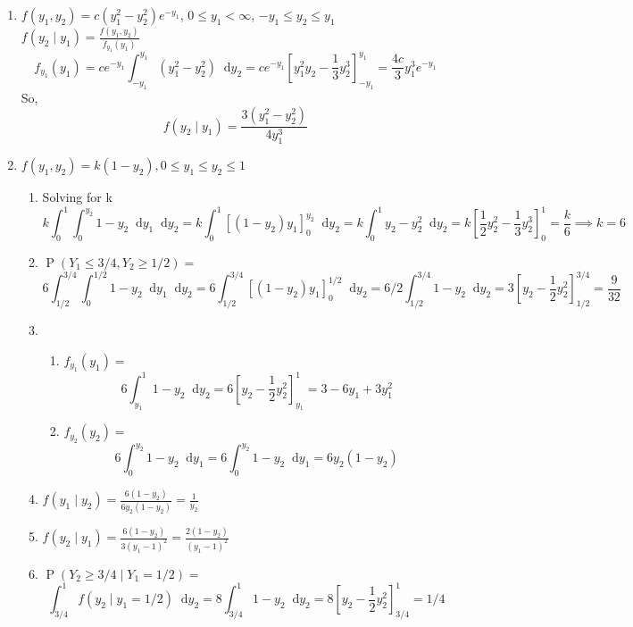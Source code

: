 \documentclass{article}
\newcommand{\pr}[1]{\operatorname{P}\left(#1\right)}
\newcommand*\diff{\mathop{}\!\mathrm{d}}
\newcommand{\intv}[4]{\int_{#3}^{#4} #1 \diff #2}
\begin{document}
\begin{enumerate}
  \item $f(y_1, y_2) = c(y_1^2 - y_2^2)e^{-y_1}$, $0 \leq y_1 < \infty$, $-y_1 \leq y_2 \leq y_1$\\
  $f(y_2 \mid y_1) = \frac{f(y_1, y_2)}{f_{y_1}(y_1)}$ 
  \[
    f_{y_1}(y_1) 
    = ce^{-y_1}\intv{(y_1^2 - y_2^2)}{y_2}{-y_1}{y_1}
    = ce^{-y_1}\left[ y_1^2y_2 - \frac{1}{3}y_2^3 \right]_{-y_1}^{y_1}
    = \frac{4c}{3}y_1^3e^{-y_1}
  \]
  So, \[
    f(y_2 \mid y_1) = \frac{3(y_1^2-y_2^2)}{4y_1^3}
  \]
  \newpage

  \item $f(y_1, y_2) = k(1-y_2), 0 \leq y_1 \leq y_2 \leq 1$
  \begin{enumerate}
    \item Solving for k\[
      k\intv{ \intv{1-y_2}{y_1}{0}{y_2} }{y_2}{0}{1}
      = k\intv{ \left[ (1-y_2)y_1 \right]_{0}^{y_2} }{y_2}{0}{1}
      = k\intv{ y_2 - y_2^2 }{y_2}{0}{1}
      = k\left[ \frac{1}{2}y_2^2 - \frac{1}{3}y_2^3 \right]_{0}^{1}
      = \frac{k}{6} \implies k = 6
    \]

    \item $\pr{Y_1 \leq 3/4, Y_2 \geq 1/2} = $ \[
      6\intv{ \intv{1-y_2}{y_1}{0}{1/2} }{y_2}{1/2}{3/4}
      = 6\intv{ \left[ (1-y_2)y_1 \right]_{0}^{1/2} }{y_2}{1/2}{3/4}
      = 6/2\intv{ 1-y_2 }{y_2}{1/2}{3/4}
      = 3 \left[ y_2 - \frac{1}{2}y_2^2 \right]_{1/2}^{3/4}
      = \frac{9}{32}
    \]

    \item \begin{enumerate}
      \item $f_{y_1}(y_1) = $ \[
        6\intv{ 1-y_2 }{y_2}{y_1}{1}
        = 6\left[ y_2-\frac{1}{2}y_2^2 \right]_{y_1}^{1}
        = 3 - 6y_1 + 3y_1^2
      \]
      \item $f_{y_2}(y_2) = $ \[
        6\intv{ 1-y_2 }{y_1}{0}{y_2}
        = 6\intv{ 1-y_2 }{y_1}{0}{y_2}
        = 6y_2(1-y_2)
      \]
    \end{enumerate}

    \item $f(y_1 \mid y_2) = \frac{6(1-y_2)}{6y_2(1-y_2)} = \frac{1}{y_2}$
    \item $f(y_2 \mid y_1) = \frac{6(1-y_2)}{3(y_1-1)^2} = \frac{2(1-y_2)}{(y_1-1)^2}$
    \item $\pr{Y_2 \geq 3/4 \mid Y_1 = 1/2} = $ \[
      \intv{ f(y_2 \mid y_1=1/2) }{y_2}{3/4}{1}
      = 8\intv{ 1-y_2 }{y_2}{3/4}{1}
      = 8\left[ y_2-\frac{1}{2}y_2^2\right]_{3/4}^{1}
      = 1/4
    \]
  \end{enumerate}
  

\end{enumerate}
\end{document}
